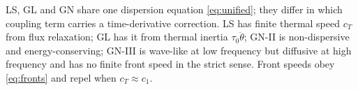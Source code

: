 \begin{summarybox}[Summary]
LS, GL and GN share one dispersion equation \eqref{eq:unified}; they differ in which coupling term carries a time-derivative correction. LS has finite thermal speed $c_T$ from flux relaxation; GL has it from thermal inertia $\tau_0\ddot\theta$; GN-II is non-dispersive and energy-conserving; GN-III is wave-like at low frequency but diffusive at high frequency and has no finite front speed in the strict sense. Front speeds obey \eqref{eq:fronts} and repel when $c_T\approx c_1$.
\end{summarybox}
